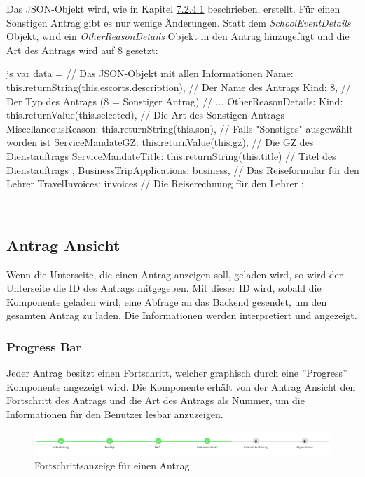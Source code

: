 Das JSON-Objekt wird, wie in Kapitel \hyperref[code_submit_data]{7.2.4.1} beschrieben, erstellt. Für einen Sonstigen Antrag gibt es nur wenige Änderungen.
Statt dem \textit{SchoolEventDetails} Objekt, wird ein \textit{OtherReasonDetails} Objekt in den Antrag hinzugefügt und die Art des Antrags wird auf 8 gesetzt:
\begin{code}{js}
var data = {		// Das JSON-Objekt mit allen Informationen
	Name: this.returnString(this.escorts.description),	// Der Name des Antrags
	Kind: 8,	// Der Typ des Antrags (8 = Sonstiger Antrag)
	// ...
	OtherReasonDetails: {
		Kind: this.returnValue(this.selected),	// Die Art des Sonstigen Antrags
		MiscellaneousReason: this.returnString(this.son),	// Falls "Sonstiges" ausgewählt worden ist
		ServiceMandateGZ: this.returnValue(this.gz),	// Die GZ des Dienstauftrags
		ServiceMandateTitle: this.returnString(this.title)	// Titel des Dienstauftrags
	},
	BusinessTripApplications: business,	// Das Reiseformular für den Lehrer
	TravelInvoices: invoices	// Die Reiserechnung für den Lehrer
};
\end{code}
~\\
\newpage
\subsection{Antrag Ansicht}
\label{sec:antrag_ansicht}
Wenn die Unterseite, die einen Antrag anzeigen soll, geladen wird, so wird der Unterseite die ID des Antrags mitgegeben. Mit dieser ID wird, sobald die Komponente geladen wird, eine Abfrage an das Backend gesendet, um den gesamten Antrag zu laden. Die Informationen werden interpretiert und angezeigt.
\subsubsection{Progress Bar}
Jeder Antrag besitzt einen Fortschritt, welcher graphisch durch eine ''Progress'' Komponente angezeigt wird. Die Komponente erhält von der Antrag Ansicht den Fortschritt des Antrags und die Art des Antrags als Nummer, um die Informationen für den Benutzer lesbar anzuzeigen.
\begin{figure}
	\centering
	\includegraphics[width=1\linewidth]{images/progress}
	\caption[Fortschrittsanzeige]{Fortschrittsanzeige für einen Antrag}
	\label{fig:progress}
\end{figure}
